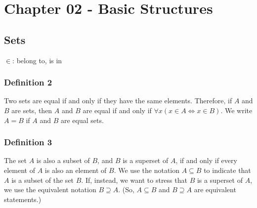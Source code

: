 \documentclass{article}
\begin{document}
\newcommand{\hr}{\par\noindent\rule{\textwidth}{0.4pt}}

\newcommand{\bc}[1]{
	\begin{equation*}
		\begin{boxed}
			{#1}
		\end{boxed}
	\end{equation*}
}

\newcommand{\cond}[2]{
	\ifmmode
		{#1} \quad {#2}
	\else
		$$ {#1} \quad {#2} $$
	\fi
}

\newcommand{\matr}[1]{
	\ifmmode \bm{#1}
	\else \textit{\textbf{#1}}
	\fi
}
\newcommand{\vect}[1]{
	\ifmmode \mathbf{#1}
	\else \textbf{#1}
	\fi
}


\tableofcontents

\section{Chapter 02 - Basic Structures}

\subsection{Sets}

\textbf{$ \in $}: belong to, is in

\subsubsection{Definition 2}

Two sets are equal if and only if they have the same elements. Therefore, if $ A $ and $ B $ are sets, then $ A $ and $ B $ are equal if and only if $ \forall x \left( x \in A \iff x \in B \right) $. We write $ A = B $ if $ A $ and $ B $ are equal sets.

\subsubsection{Definition 3}

The set $ A $ is also a subset of $ B $, and $ B $ is a superset of $ A $, if and only if every element of $ A $ is also an element of $ B $. We use the notation $ A \subseteq B $ to indicate that $ A $ is a subset of the set $ B $. If, instead, we want to stress that $ B $ is a superset of $ A $, we use the equivalent notation $ B \supseteq A $. (So, $ A \subseteq B $ and $ B \supseteq A $ are equivalent statements.)
\end{document}
